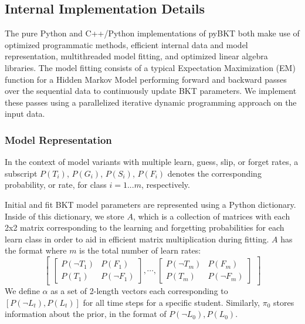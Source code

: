 \documentclass{edm_article}
\begin{document}
\subsection{Internal Implementation Details}

The pure Python and C++/Python implementations of pyBKT both make use of optimized programmatic methods, efficient internal data and model representation, multithreaded model fitting, and optimized linear algebra libraries. The model fitting consists of a typical Expectation Maximization (EM) function for a Hidden Markov Model performing forward and backward passes over the sequential data to continuously update BKT parameters. We implement these passes using a parallelized iterative dynamic programming approach on the input data. 

\subsubsection{Model Representation}
In the context of model variants with multiple learn, guess, slip, or forget rates, a subscript $P(T_i)$, $P(G_i)$, $P(S_i)$, $P(F_i)$ denotes the corresponding probability, or rate, for class $i = 1 ... m$, respectively.

Initial and fit BKT model parameters are represented using a Python dictionary. Inside of this dictionary, we store $A$, which is a collection of matrices with each 2x2 matrix corresponding to the learning and forgetting probabilities for each learn class in order to aid in efficient matrix multiplication during fitting. $A$ has the format where $m$ is the total number of learn rates: \[
\begin{bmatrix}
\begin{bmatrix}
    P(\neg{T}_1)  &  P(F_1)      \\
    P(T_1)  &  P(\neg{F}_1)      
\end{bmatrix}
, \cdots,
\begin{bmatrix}
    P(\neg{T}_m)  &  P(F_m)      \\
    P(T_m)  &  P(\neg{F}_m)       
\end{bmatrix} 
\end{bmatrix}
\]
We define $\alpha$ as a set of 2-length vectors each corresponding to $[P(\neg{L}_t), P(L_t)]$ for all time steps for a specific student. Similarly, $\pi_0$ stores information about the prior, in the format of $P(\neg{L}_0), P(L_0)$. 
\end{document}
